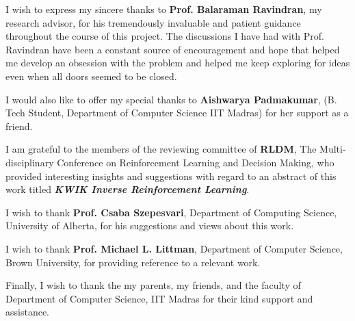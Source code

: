 I wish to express my sincere thanks to \textbf{Prof. Balaraman Ravindran}, my research advisor, for his tremendously invaluable and patient guidance throughout the course of this project. The discussions I have had with Prof. Ravindran have been a constant source of encouragement and hope that helped me develop an obsession with the problem and helped me keep exploring for ideas even when all doors seemed to be closed.   

I would also like to offer my special thanks to \textbf{Aishwarya Padmakumar}, (B. Tech Student, Department of Computer Science IIT Madras) for her support as a friend. 

I am grateful to the members of the reviewing committee of\textbf{ RLDM}, The Multi-disciplinary Conference on Reinforcement Learning and Decision Making, who provided interesting insights and suggestions with regard to an abstract of this work titled \textit{\textbf{KWIK Inverse Reinforcement Learning}}. 

I wish to thank\textbf{ Prof. Csaba Szepesvari},  Department of Computing Science, University of Alberta, for his suggestions and views about this work. 

I wish to thank \textbf{Prof. Michael L. Littman}, Department of Computer Science, Brown University, for providing reference to a relevant work. 

Finally, I wish to thank the my parents, my friends, and the faculty of Department of Computer Science, IIT Madras for their kind support and assistance. 





 